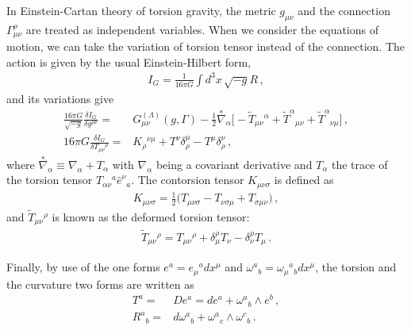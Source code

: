 \documentclass[11pt]{article}
\numberwithin{equation}{section}
\begin{document}
In Einstein-Cartan theory of torsion gravity, the metric $g_{\mu\nu}$
and the connection $\Gamma_{\mu\nu}^\rho$ are treated as independent variables.
When we consider the equations of motion, we can take the variation of torsion tensor
instead of the connection.
The action is given by the usual Einstein-Hilbert form,
\begin{align}
  I_G= \frac{1}{16 \pi G} \int d^3 x \, \sqrt{-g} R \,,
\end{align}
and its variations give
\begin{align}
\frac{16\pi G}{\sqrt{-g}} \frac{\delta I_G}{\delta g^{\mu\nu}}=&
  G_{\mu\nu}^{(\Lambda)}(g,\Gamma) -\frac{1}{2}  \overset{*}{\nabla}_\alpha
\big[- \tilde{T}_{\mu\nu}{}^\alpha+\tilde{T}^\alpha{}_{\mu\nu}+\tilde{T}^\alpha{}_{\nu\mu} \big] \,,\\
16\pi G \frac{\delta I_G}{\delta T_{\mu\nu}{}^\rho}=&
K_\rho{}^{\nu\mu}+T^\nu\delta^\mu_\rho-T^\mu\delta^\nu_\rho \,,
\end{align}
where $\overset{*}{\nabla}_\alpha \equiv \nabla_\alpha + T_\alpha$
with $\nabla_\alpha$ being a covariant derivative 
and $T_\alpha$ the trace of the torsion tensor
$T_{\alpha\nu}{}^a \hat{e}^\nu{}_a$.
The contorsion tensor $K_{\mu\nu\sigma}$ is defined as
\begin{align}
  K_{\mu\nu\sigma} = \frac{1}{2} \big(T_{\mu\nu\sigma} - T_{\nu\sigma\mu} + T_{\sigma\mu\nu}  \big) \,,
\end{align}
and
$\tilde{T}_{\mu\nu}{}^\rho$ is known as the deformed torsion tensor:
\begin{align}
  \tilde{T}_{\mu\nu}{}^\rho= T_{\mu\nu}{}^\rho + \delta^\rho_\mu T_\nu -
  \delta^\rho_\nu T_\mu 
\,.
\end{align}

Finally, by use of the one forms $e^a=e_\mu{}^a dx^\mu$ and $\omega^a{}_b=\omega_\mu{}^a{}_b dx^\mu$,
the torsion and the curvature two forms are written as 
\begin{align}
  T^a=& De^a=de^a + \omega^a{}_b \wedge e^b \,,\\
R^a{}_b =& d\omega^a{}_b + \omega^a{}_c \wedge \omega^c{}_b \,.
\end{align}





 
\end{document}
